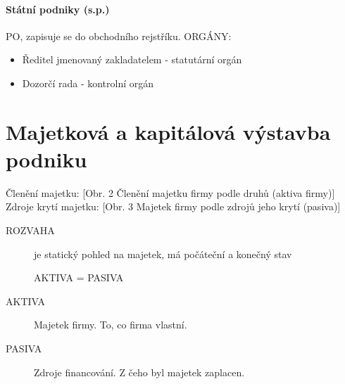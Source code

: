 \documentclass[11pt,a4paper,twoside]{book}
\begin{document}
				\subsubsection{Státní podniky (s.p.)}
					PO, zapisuje se do obchodního rejstříku.
					ORGÁNY:
						\begin{itemize}
							\item Ředitel jmenovaný zakladatelem - statutární orgán
							\item Dozorčí rada - kontrolní orgán
						\end{itemize}

	\chapter{Majetková a kapitálová výstavba podniku}
	Členění majetku:
	[Obr. 2 Členění majetku firmy podle druhů (aktiva firmy)]
	Zdroje krytí majetku:
	[Obr. 3 Majetek firmy podle zdrojů jeho krytí (pasiva)]
	\begin{description}
		\item[ROZVAHA] je statický pohled na majetek, má počáteční a konečný stav \par
			\begin{center}
				{\Large AKTIVA = PASIVA}
			\end{center}
		\item[AKTIVA] Majetek firmy. To, co firma vlastní.
		\item[PASIVA] Zdroje financování. Z čeho byl majetek zaplacen.
	\end{description}
\end{document}
